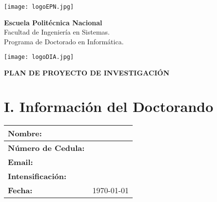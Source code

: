 \documentclass[a4paper,12pt]{article}
\author{Maria Pérez}
\begin{document}
	
	\begin{minipage}{0.15\textwidth}
			\texttt{[image: logoEPN.jpg]} \hspace{0.5cm}
	\end{minipage}
	\hfill
	\begin{minipage}{0.6\textwidth}

\begin{center}

	\large \textbf{Escuela Politécnica Nacional} \\
	\large Facultad de Ingeniería en Sistemas.\\ 
	\large Programa de Doctorado en Informática. \\ 
\end{center}
	\end{minipage}
	\hfill
	\begin{minipage}{0.15\textwidth}
		\texttt{[image: logoDIA.jpg]} \\ %
	\end{minipage}
	
	\vspace{1cm}
	

	\begin{center}
		\huge \textbf{PLAN DE PROYECTO DE INVESTIGACIÓN}
	\end{center}
	\thispagestyle{empty}  %
	\vspace{0.5cm}
		\section*{I. Información del Doctorando}
	\begin{longtable}{|p{}|p{}|}
		\hline
		\textbf{Nombre:} &  \\ \hline
		\textbf{Número de Cedula:} &  \\ \hline
		\textbf{Email:} &  \\ \hline
		\textbf{Intensificación:} & \\ \hline
%		
	\textbf{Fecha:} & \today\\ \hline
	\end{longtable}
	
\end{document}
